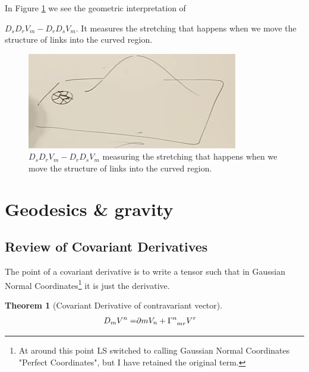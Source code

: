 \documentclass[]{article}
\newtheorem{thm}{Theorem}
\begin{document}
In Figure \ref{fig:gr-3-move-links} we see the geometric interpretation of {$D_s D_r V_m - D_r D_s V_m$. It measures the stretching that happens when we move the structure of links into the curved region.

\begin{figure}[H]
	\caption[Geometric meaning of $D_s D_r V_m - D_r D_s V_m$]{$D_s D_r V_m - D_r D_s V_m$ measuring the stretching that happens when we move the structure of links into the curved region.}\label{fig:gr-3-move-links}
	\includegraphics{gr-3-move-links}
\end{figure}


\section{Geodesics \& gravity}

\subsection{Review of Covariant Derivatives}

The point of a covariant derivative is to write a tensor such that in Gaussian Normal Coordinates\footnote{At around this point LS switched to calling Gaussian Normal Coordinates "Perfect Coordinates", but I have retained the original term.} it is just the derivative.

\begin{thm}[Covariant Derivative of contravariant vector]
	\begin{align*}
		D_m V^n =& \partial m V_n + \Gamma\indices{^n_{mr}} V^r
	\end{align*}
\end{thm}

}
\end{document}

